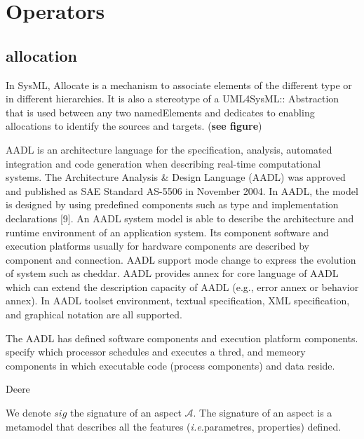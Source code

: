 \section{Operators}

\subsection{allocation}
In SysML, Allocate is a mechanism to associate elements of the different type or in different hierarchies. It is also a stereotype of a UML4SysML:: Abstraction that is used between any two namedElements and dedicates to enabling allocations to identify the sources and targets. (\textbf{see figure}) 

AADL is an architecture language for the specification, analysis, automated integration and code generation when describing real-time computational systems. The Architecture Analysis \& Design Language (AADL) was approved and published as SAE Standard AS-5506 in November 2004. In AADL, the model is designed by using predefined components such as type and implementation declarations  [9]. An AADL system model is able to describe the architecture and runtime environment of an application system. Its component software and execution platforms usually for hardware components are described by component and connection. AADL support mode change to express the evolution of system such as cheddar. AADL provides annex for core language of AADL which can extend the description capacity of AADL (e.g., error annex or behavior annex). In AADL toolset environment, textual specification, XML specification, and graphical notation are all supported.

The AADL has defined software components and execution platform components. specify which processor schedules and executes a thred, and memeory components in which executable code (process components) and data reside.

\begin{defn}
Deere
\end{defn}






We denote $sig$ the signature of an aspect $\mathcal{A}$. The signature of an aspect is a metamodel that describes all the features (\textit{i.e.}parametres, properties) defined.